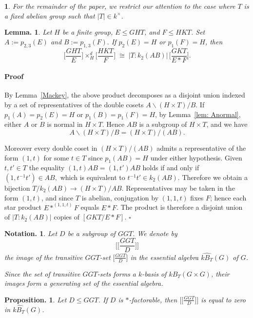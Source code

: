 \documentclass[12pt]{article}
\theoremstyle{change}
\newtheorem{lem}[theorem]{Lemma.}
\newtheorem{prop}[theorem]{Proposition.}
\newtheorem{notation}[theorem]{Notation.}
\newtheorem{nothing}[theorem]{}
\newenvironment{proof}{\paragraph{Proof}}{\hfill$\square$}
\renewcommand{\le}{\leqslant} %
\newcommand{\1}{{\bf 1}}
\begin{document}
\begin{nothing}
\label{sec: abelian}
For the remainder of the paper, we restrict our attention to the case where $T$ is a fixed abelian group such that $|T|\in k^{\times}$.
\end{nothing}

\begin{lem}\label{lem: product}
Let \(H\) be a finite group, \(E \leq GHT\), and \(F \leq HKT\). Set \(A := p_{2,3}(E)\)
and \(B := p_{1,3}(F).\) If \(p_2(E)=H\) or \(p_1(F)=H\), then
$$
\Big[\frac{GHT}{E} \Big] \times_H^d \Big[\frac{HKT}{F} \Big]
\;\cong\;
|T:k_2(AB)| \, \Big[\frac{GKT}{E*F} \Big].
$$
\end{lem}

\begin{proof}
By Lemma~\ref{Mackey}, the above product decomposes as a disjoint union indexed by a set of representatives of the double cosets $A \backslash (H \times T) / B$. If
\(p_1(A) = p_2(E)=H\) or \(p_1(B) = p_1(F)=H\), by Lemma~\ref{lem: Anormal}, either \(A\) or \(B\) is normal in \(H\times T\). Hence \(AB\) is a subgroup of \(H\times T\), and we have
$$
A \backslash (H\times T)/B = (H\times T)/(AB).
$$

Moreover every double coset in \((H\times T)/(AB)\) admits a representative of the form \((1,t)\) for some \(t\in T\) since $p_1(AB) = H$ under either hypothesis. Given $t, t'\in T$ the equality \((1,t)AB=(1,t')AB\) holds if and only if \( (1,t^{-1}t')\in AB,\) which is equivalent to \( t^{-1}t'\in k_2(AB).\) Therefore we obtain a bijection $T/k_2(AB) \to (H\times T)/AB.$
Representatives may be taken in the form $(1,t)$, and since $T$ is abelian, conjugation by $(1,1,t)$ fixes $F$; hence each star product $E\ast^{(1,1,t)}F$ equals $E\ast F$. The product is therefore a disjoint union of $|T:k_2(AB)|$ copies of $[GKT/E\ast F]$.
\end{proof}

\begin{notation}
Let $D$ be a subgroup of $GGT$. We denote by
\[
\Big[\Big[\frac{GGT}{D}\Big]\Big]
\]
the image of the transitive $GGT$-set $\Big[\frac{GGT}{D}\Big]$ in the essential algebra $\widehat{kB_T}(G)$ of $G$.

Since the set of transitive $GGT$-sets forms a $k$-basis of $kB_T(G \times G)$, their images form a generating set of the essential algebra.
\end{notation}

\begin{prop}
\label{zeros}
Let $D\le GGT$.  If $D$ is $\ast$-factorable, then
$\Big[\Big[\frac{GGT}{D}\Big]\Big]$
is equal to zero in $\widehat{kB_T}(G)$.
\end{prop}
\end{document}
